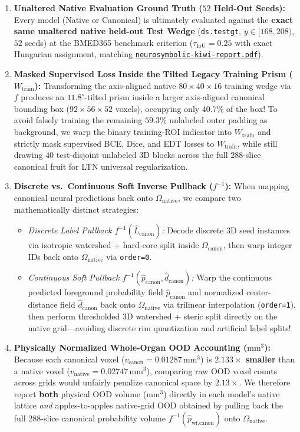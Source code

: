 \documentclass[10pt,a4paper]{article}
\renewcommand{\_}{\origunderscore\allowbreak}
\newcommand{\ghblob}{https://github.com/arvidl/BMED365-2027/blob/main}
\newcommand{\repodir}{Lab4-Comp-Imag/Kiwi-challenge/docs/neurosymbolic-report}
\newcommand{\natrep}{\href{\ghblob/\repodir/neurosymbolic-kiwi-report.pdf}{\texttt{neurosymbolic-\allowbreak kiwi-\allowbreak report.pdf}}}
\begin{document}
\begin{enumerate}
    \item \textbf{Unaltered Native Evaluation Ground Truth ($52$ Held-Out Seeds):} Every model (Native or Canonical) is ultimately evaluated against the \textbf{exact same unaltered native held-out Test Wedge} (\texttt{ds.test\_gt}, $y \in [168, 208)$, $52$ seeds) at the BMED365 benchmark criterion ($\tau_{\text{IoU}} = 0.25$ with exact Hungarian assignment, matching \natrep{}).
    \item \textbf{Masked Supervised Loss Inside the Tilted Legacy Training Prism ($W_{\text{train}}$):} Transforming the axis-aligned native $80\times 40\times 16$ training wedge via $f$ produces an $11.8^\circ$-tilted prism inside a larger axis-aligned canonical bounding box ($92\times 56\times 52$ voxels), occupying only \textbf{$40.7\%$} of the box! To avoid falsely training the remaining $59.3\%$ unlabeled outer padding as background, we warp the binary training-ROI indicator into $W_{\text{train}}$ and strictly mask supervised BCE, Dice, and EDT losses to $W_{\text{train}}$, while still drawing $40$ test-disjoint unlabeled 3D blocks across the full 288-slice canonical fruit for LTN universal regularization.
    \item \textbf{Discrete vs.\ Continuous Soft Inverse Pullback ($f^{-1}$):} When mapping canonical neural predictions back onto $\Omega_{\text{native}}$, we compare two mathematically distinct strategies:
    \begin{itemize}
        \item \emph{Discrete Label Pullback $f^{-1}(\hat{L}_{\text{canon}})$:} Decode discrete 3D seed instances via isotropic watershed + hard-core split inside $\Omega_{\text{canon}}$, then warp integer IDs back onto $\Omega_{\text{native}}$ via \texttt{order=0}.
        \item \emph{Continuous Soft Pullback $f^{-1}(\hat{p}_{\text{canon}}, \hat{d}_{\text{canon}})$:} Warp the continuous predicted foreground probability field $\hat{p}_{\text{canon}}$ and normalized center-distance field $\hat{d}_{\text{canon}}$ back onto $\Omega_{\text{native}}$ via trilinear interpolation (\texttt{order=1}), then perform thresholded 3D watershed + steric split directly on the native grid---avoiding discrete rim quantization and artificial label splits!
    \end{itemize}
    \item \textbf{Physically Normalized Whole-Organ OOD Accounting ($\text{mm}^3$):} Because each canonical voxel ($v_{\text{canon}} = 0.01287\,\text{mm}^3$) is \textbf{$2.133\times$ smaller} than a native voxel ($v_{\text{native}} = 0.02747\,\text{mm}^3$), comparing raw OOD voxel counts across grids would unfairly penalize canonical space by $2.13\times$. We therefore report \textbf{both} physical OOD volume ($\text{mm}^3$) directly in each model's native lattice \emph{and} apples-to-apples native-grid OOD obtained by pulling back the full 288-slice canonical probability volume $f^{-1}(\hat{p}_{\text{wf,canon}})$ onto $\Omega_{\text{native}}$.

\end{enumerate}
\end{document}
